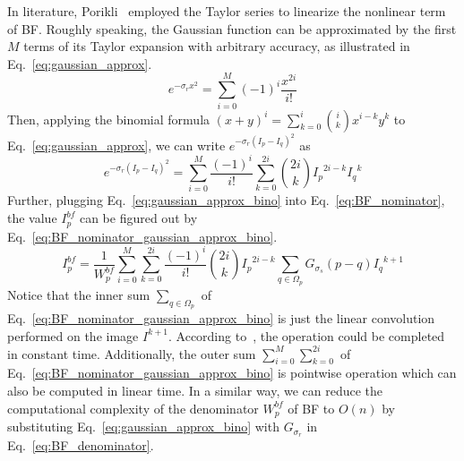 \documentclass[twocolumn]{el-author}
\begin{document}
In literature, Porikli~\cite{Porikli_CVPR_2008} employed the Taylor series to linearize the nonlinear term of BF. Roughly speaking, the Gaussian function can be approximated by the first $M$ terms of its Taylor expansion with arbitrary accuracy, as illustrated in Eq.~\eqref{eq:gaussian_approx}.
%
\begin{equation}
e^{-{\sigma_r}{x^2}} = \sum_{i=0}^M (-1)^i \frac{x^{2i}}{i!}
\label{eq:gaussian_approx}
\end{equation}
%
Then, applying the binomial formula $(x+y)^i = \sum_{k=0}^i {i \choose k}x^{i-k}y^k$ to Eq.~\eqref{eq:gaussian_approx}, we can write $e^{-{\sigma_r}{(I_p - I_q)^2}}$ as
%
\begin{equation}
e^{-{\sigma_r}{(I_p - I_q)^2}} = \sum_{i=0}^M \frac{(-1)^i}{i!} \sum_{k=0}^{2i} {2i \choose k}{I_p}^{2i-k}{I_q}^k
\label{eq:gaussian_approx_bino}
\end{equation}
%
Further, plugging Eq.~\eqref{eq:gaussian_approx_bino} into Eq.~\eqref{eq:BF_nominator}, the value $I_p^{bf}$ can be figured out by Eq.~\eqref{eq:BF_nominator_gaussian_approx_bino}.
%
\begin{equation}
I_p^{bf} = \frac{1}{W^{bf}_{p}} \sum_{i=0}^M \sum_{k=0}^{2i} \frac{(-1)^i}{i!} {2i \choose k}{I_p}^{2i-k} \sum_{q \in \Omega_p} G_{\sigma_s} (p-q)  {I_q}^{k+1}
\label{eq:BF_nominator_gaussian_approx_bino}
\end{equation}
%
Notice that the inner sum $\sum_{q \in \Omega_p}$ of Eq.~\eqref{eq:BF_nominator_gaussian_approx_bino} is just the linear convolution performed on the image $I^{k+1}$.  According to~\cite{Young_SP_1995}, the operation could be completed in constant time. Additionally, the outer sum $\sum_{i=0}^M \sum_{k=0}^{2i}$ of Eq.~\eqref{eq:BF_nominator_gaussian_approx_bino} is pointwise operation which can also be computed in linear time. In a similar way, we can reduce the computational complexity of the denominator $W^{bf}_{p}$ of BF to $O(n)$ by substituting Eq.~\eqref{eq:gaussian_approx_bino} with $G_{\sigma_r}$ in Eq.~\eqref{eq:BF_denominator}.
\end{document}
